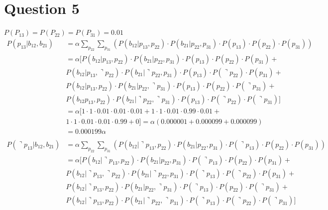 \documentclass[letterpaper, 12pt]{artikel3}
\begin{document}
\section*{Question 5}
$P(P_{13}) = P(P_{22}) = P(P_{31}) = 0.01$
\begin{align*}
P(p_{13}| b_{12},b_{21}) &=\alpha \sum_{p_{22}} \sum_{p_{31}}(P(b_{12}|p_{13},p_{22}) \cdot P(b_{21}|p_{22},p_{31})\cdot P(p_{13}) \cdot P(p_{22}) \cdot P(p_{31}) )  \\
&=  \alpha[ P(b_{12}|p_{13},p_{22}) \cdot P(b_{21}|p_{22},p_{31})\cdot  P(p_{13}) \cdot P(p_{22}) \cdot P(p_{31})  +  \\
\quad & P(b_{12}|p_{13},\urcorner p_{22}) \cdot P(b_{21}|\urcorner  p_{22},p_{31})\cdot  P(p_{13}) \cdot P( \urcorner p_{22}) \cdot P(p_{31})  + \\
\quad& P(b_{12}|p_{13},p_{22}) \cdot P(b_{21}|p_{22},\urcorner p_{31})\cdot  P(p_{13}) \cdot P(p_{22}) \cdot P(\urcorner p_{31}) +\\
\quad& P(b_{12} p_{13},p_{22}) \cdot P(b_{21}|\urcorner p_{22},\urcorner p_{31})\cdot  P(p_{13}) \cdot P(\urcorner p_{22}) \cdot P(\urcorner p_{31}) ] \\
&= \alpha [1 \cdot 1  \cdot 0.01 \cdot 0.01 \cdot 0.01 + 1 \cdot 1 \cdot 0.01 \cdot 0.99 \cdot 0.01 + \\
& 1 \cdot 1 \cdot 0.01 \cdot 0.01 \cdot 0.99 + 0]  = \alpha (0.000001 + 0.000099 + 0.000099) \\ 
&= 0.000199 \alpha \\
\\
P(\urcorner p_{13}| b_{12},b_{21}) &=\alpha \sum_{p_{22}} \sum_{p_{31}}(P(b_{12}|\urcorner p_{13},p_{22}) \cdot P(b_{21}|p_{22},p_{31})\cdot P(\urcorner  p_{13}) \cdot P(p_{22}) \cdot P(p_{31}) ) \\ 
&=  \alpha[ P(b_{12}|\urcorner p_{13},p_{22}) \cdot P(b_{21}|p_{22},p_{31})\cdot  P(\urcorner p_{13}) \cdot P(p_{22}) \cdot P(p_{31}) +  \\
\quad & P(b_{12}|\urcorner p_{13},\urcorner p_{22}) \cdot P(b_{21}|\urcorner  p_{22},p_{31})\cdot  P(\urcorner p_{13}) \cdot P( \urcorner p_{22}) \cdot P(p_{31})  + \\
\quad& P(b_{12}|\urcorner p_{13},p_{22}) \cdot P(b_{21}|p_{22},\urcorner p_{31})\cdot  P(\urcorner p_{13}) \cdot P(p_{22}) \cdot P(\urcorner p_{31}) +\\
\quad& P(b_{12} |\urcorner p_{13},p_{22}) \cdot P(b_{21}|\urcorner p_{22},\urcorner p_{31})\cdot  P(\urcorner p_{13}) \cdot P(\urcorner p_{22}) \cdot P(\urcorner p_{31}) ] \\

\end{align*}
\end{document}
